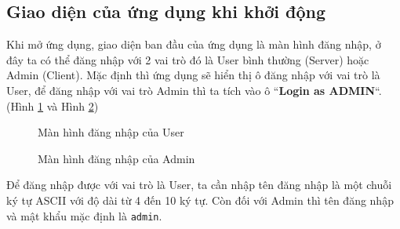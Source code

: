\subsection{Giao diện của ứng dụng khi khởi động}
Khi mở ứng dụng, giao diện ban đầu của ứng dụng là màn hình đăng nhập, ở đây ta có thể đăng nhập với 2 vai trò đó là User bình thường (Server) hoặc Admin (Client). Mặc định thì ứng dụng sẽ hiển thị ô đăng nhập với vai trò là User, để đăng nhập với vai trò Admin thì ta tích vào ô ``\textbf{Login as ADMIN}``. (Hình \ref{fig:ServerLogin} và Hình \ref{fig:ClientLogin})

\begin{figure}[H]
	\caption{Màn hình đăng nhập của User}
	\label{fig:ServerLogin}
\end{figure}

\begin{figure}[H]
	\caption{Màn hình đăng nhập của Admin}
	\label{fig:ClientLogin}
\end{figure}

Để đăng nhập được với vai trò là User, ta cần nhập tên đăng nhập là một chuỗi ký tự ASCII với độ dài từ 4 đến 10 ký tự. Còn đối với Admin thì tên đăng nhập và mật khẩu mặc định là \verb|admin|.